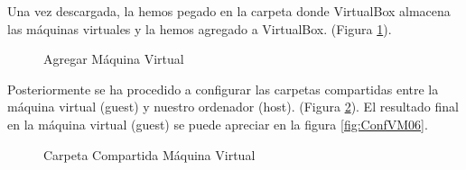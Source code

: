 \documentclass{scrartcl}
\begin{document}
Una vez descargada, la hemos pegado en la carpeta donde VirtualBox almacena las máquinas virtuales y la hemos agregado a VirtualBox. (Figura \ref{fig:ConfVM02}).

\begin{figure}[H]
	
	\centering
	\caption{Agregar Máquina Virtual}
	\label{fig:ConfVM02}
	
\end{figure}

Posteriormente se ha procedido a configurar las carpetas compartidas entre la máquina virtual (guest) y nuestro ordenador (host). (Figura \ref{fig:ConfVM03}). El resultado final en la máquina virtual (guest) se puede apreciar en la figura \ref{fig:ConfVM06}.

\begin{figure}[H]
	
	\centering
	\caption{Carpeta Compartida Máquina Virtual}
	\label{fig:ConfVM03}
	
\end{figure}
\end{document}
